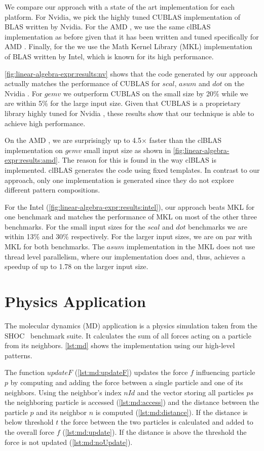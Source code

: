 We compare our approach with a state of the art implementation for each platform.
For Nvidia, we pick the highly tuned CUBLAS implementation of BLAS written by Nvidia.
For the AMD \GPU, we use the same clBLAS implementation as before given that it has been written and tuned specifically for AMD \GPUs.
Finally, for the \CPU we use the Math Kernel Library (MKL) implementation of BLAS written by Intel, which is known for its high performance.

\autoref{fig:linear-algebra-expr:results:nv} shows that the code generated by our approach actually matches the performance of CUBLAS for $scal$, $asum$ and $dot$ on the Nvidia \GPU.
For $gemv$ we outperform CUBLAS on the small size by 20\% while we are within 5\% for the large input size.
Given that CUBLAS is a proprietary library highly tuned for Nvidia \GPUs, these results show that our technique is able to achieve high performance.

On the AMD \GPU, we are surprisingly up to 4.5$\times$ faster than the clBLAS implementation on $gemv$ small input size as shown in \autoref{fig:linear-algebra-expr:results:amd}.
The reason for this is found in the way clBLAS is implemented.
clBLAS generates the \OpenCL code using fixed templates.
In contrast to our approach, only one implementation is generated since they do not explore different pattern compositions.

For the Intel \CPU (\autoref{fig:linear-algebra-expr:results:intel}), our approach beats MKL for one benchmark and matches the performance of MKL on most of the other three benchmarks.
For the small input sizes for the $scal$ and $dot$ benchmarks we are within 13\% and 30\% respectively.
For the larger input sizes, we are on par with MKL for both benchmarks.
The $asum$ implementation in the MKL does not use thread level parallelism, where our implementation does and, thus, achieves a speedup of up to 1.78 on the larger input size.


\section{Physics Application}

The molecular dynamics (MD) application is a physics simulation taken from the SHOC~\cite{DanalisMMMRSTV10} benchmark suite.
It calculates the sum of all forces acting on a particle from its neighbors.
\autoref{lst:md} shows the implementation using our high-level patterns.

The function $updateF$ (\autoref{lst:md:updateF}) updates the force $f$ influencing particle $p$ by computing and adding the force between a single particle and one of its neighbors.
Using the neighbor's index $nId$ and the vector storing all particles $ps$ the neighboring particle is accessed (\autoref{lst:md:access}) and the distance between the particle $p$ and its neighbor $n$ is computed (\autoref{lst:md:distance}).
If the distance is below threshold $t$ the force between the two particles is calculated and added to the overall force $f$ (\autoref{lst:md:update}).
If the distance is above the threshold the force is not updated (\autoref{lst:md:noUpdate}).

